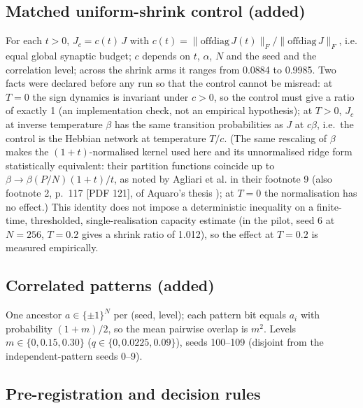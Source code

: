 \subsection{Matched uniform-shrink control
(added)}\label{matched-uniform-shrink-control-added}

For each \(t > 0\), \(J_c = c(t)\,J\) with
\(c(t) = \|\mathrm{offdiag}\,J(t)\|_F / \|\mathrm{offdiag}\,J\|_F\),
i.e. equal global synaptic budget; \(c\) depends on \(t\), \(\alpha\),
\(N\) and the seed and the correlation level; across the shrink arms it
ranges from 0.0884 to 0.9985. Two facts were declared before any run so
that the control cannot be misread: at \(T = 0\) the sign dynamics is
invariant under \(c > 0\), so the control must give a ratio of exactly 1
(an implementation check, not an empirical hypothesis); at \(T > 0\),
\(J_c\) at inverse temperature \(\beta\) has the same transition
probabilities as \(J\) at \(c\beta\), i.e.~the control is the Hebbian
network at temperature \(T/c\). (The same rescaling of \(\beta\) makes
the \((1+t)\)-normalised kernel used here and its unnormalised ridge
form statistically equivalent: their partition functions coincide up to
\(\beta \to \beta (P/N)(1+t)/t\), as noted by Agliari et al.
\supercite{agliari2024regularization} in their footnote 9 (also footnote
2, p.~117 {[}PDF 121{]}, of Aquaro's thesis
\supercite{aquaro2025thesis}); at \(T = 0\) the normalisation has no
effect.) This identity does not impose a deterministic inequality on a
finite-time, thresholded, single-realisation capacity estimate (in the
pilot, seed 6 at \(N = 256\), \(T = 0.2\) gives a shrink ratio of
1.012), so the effect at \(T = 0.2\) is measured empirically.

\subsection{Correlated patterns
(added)}\label{correlated-patterns-added}

One ancestor \(a \in \{\pm1\}^N\) per (seed, level); each pattern bit
equals \(a_i\) with probability \((1+m)/2\), so the mean pairwise
overlap is \(m^2\). Levels \(m \in \{0, 0.15, 0.30\}\)
(\(q \in \{0, 0.0225, 0.09\}\)), seeds 100--109 (disjoint from the
independent-pattern seeds 0--9).

\subsection{Pre-registration and decision
rules}\label{pre-registration-and-decision-rules}

